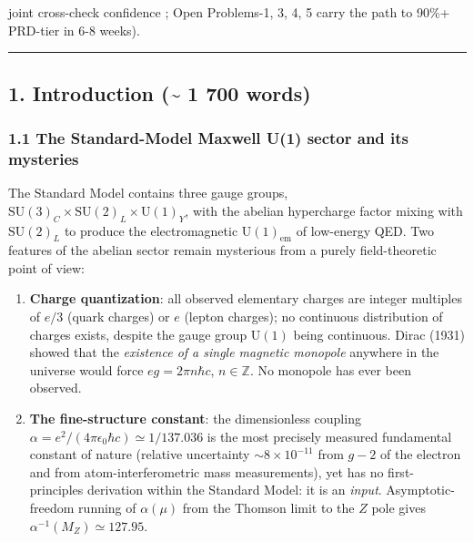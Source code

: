 \documentclass[
  11pt,
  a4paper,
]{article}
\begin{document}
joint cross-check confidence ; Open Problems-1, 3, 4, 5 carry the path to 90\%+ PRD-tier in 6-8 weeks).

\begin{center}\rule{0.5\linewidth}{0.5pt}\end{center}

\hypertarget{introduction-1-700-words}{%
\subsection{1. Introduction (\textasciitilde{} 1 700 words)}\label{introduction-1-700-words}}

\hypertarget{the-standard-model-maxwell-u1-sector-and-its-mysteries}{%
\subsubsection{1.1 The Standard-Model Maxwell U(1) sector and its mysteries}\label{the-standard-model-maxwell-u1-sector-and-its-mysteries}}

The Standard Model contains three gauge groups, \(\mathrm{SU}(3)_C \times \mathrm{SU}(2)_L \times \mathrm{U}(1)_Y\), with the abelian hypercharge factor mixing with \(\mathrm{SU}(2)_L\) to produce the electromagnetic \(\mathrm{U}(1)_{\mathrm{em}}\) of low-energy QED. Two features of the abelian sector remain mysterious from a purely field-theoretic point of view:

\begin{enumerate}
\def\labelenumi{\arabic{enumi}.}
\item
  \textbf{Charge quantization}: all observed elementary charges are integer multiples of \(e/3\) (quark charges) or \(e\) (lepton charges); no continuous distribution of charges exists, despite the gauge group \(\mathrm{U}(1)\) being continuous. Dirac (1931) showed that the \emph{existence of a single magnetic monopole} anywhere in the universe would force \(eg = 2\pi n \hbar c\), \(n \in \mathbb{Z}\). No monopole has ever been observed.
\item
  \textbf{The fine-structure constant}: the dimensionless coupling \(\alpha = e^2/(4\pi\epsilon_0 \hbar c) \simeq 1/137.036\) is the most precisely measured fundamental constant of nature (relative uncertainty \(\sim 8 \times 10^{-11}\) from \(g-2\) of the electron and from atom-interferometric mass measurements), yet has no first-principles derivation within the Standard Model: it is an \emph{input}. Asymptotic-freedom running of \(\alpha(\mu)\) from the Thomson limit to the \(Z\) pole gives \(\alpha^{-1}(M_Z) \simeq 127.95\).
\end{enumerate}
\end{document}
